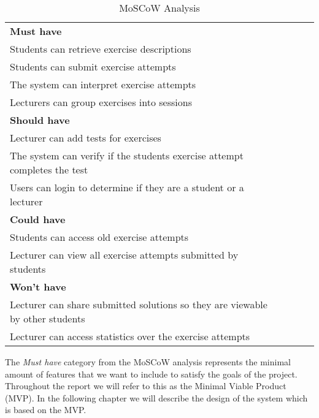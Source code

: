\begin{table}[H]
    \begin{tabular}{|l|llll}
    \cline{1-1}
    \cellcolor[HTML]{C0C0C0}\textbf{Must have}                                    &  &  &  &  \\ \cline{1-1}
    Students can retrieve exercise descriptions                                   &  &  &  &  \\ \cline{1-1}
    Students can submit exercise attempts                                         &  &  &  &  \\ \cline{1-1}
    The system can interpret exercise attempts                                    &  &  &  &  \\ \cline{1-1}
    Lecturers can group exercises into sessions                                   &  &  &  &  \\ \cline{1-1}
    \cellcolor[HTML]{C0C0C0}\textbf{Should have}                                  &  &  &  &  \\ \cline{1-1}
    Lecturer can add tests for exercises                                          &  &  &  &  \\ \cline{1-1}
    The system can verify if the students exercise attempt completes the test     &  &  &  &  \\ \cline{1-1}
    Users can login to determine if they are a student or a lecturer              &  &  &  &  \\ \cline{1-1}
    \cellcolor[HTML]{C0C0C0}\textbf{Could have}                                   &  &  &  &  \\ \cline{1-1}
    Students can access old exercise attempts                                     &  &  &  &  \\ \cline{1-1}
    Lecturer can view all exercise attempts submitted by students                 &  &  &  &  \\ \cline{1-1}
    \cellcolor[HTML]{C0C0C0}\textbf{Won't have}                                    &  &  &  &  \\ \cline{1-1}
    Lecturer can share submitted solutions so they are viewable by other students &  &  &  &  \\ \cline{1-1}
    Lecturer can access statistics over the exercise attempts                     &  &  &  &  \\ \cline{1-1}
    \end{tabular}
    \caption{\label{tab:MoSCoW}MoSCoW Analysis}
\end{table}
The \textit{Must have} category from the MoSCoW analysis represents the minimal amount of features that we want to include to satisfy the goals of the project. Throughout the report we will refer to this as the Minimal Viable Product (MVP).
In the following chapter we will describe the design of the system which is based on the MVP.
